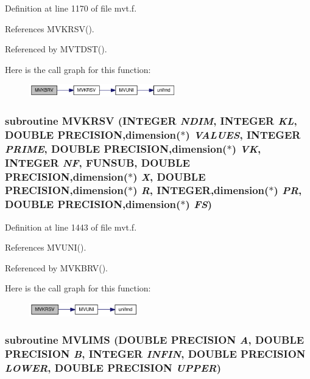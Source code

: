Definition at line 1170 of file mvt.f.

References MVKRSV().

Referenced by MVTDST().

Here is the call graph for this function:\nopagebreak
\begin{figure}[H]
\begin{center}
\leavevmode
\includegraphics[width=181pt]{mvt_8f_53a2e447659c04eb0ad551cf58c77d37_cgraph}
\end{center}
\end{figure}
\hypertarget{mvt_8f_6b32b1cb4d3243c9ffef2622d8cfa65d}{
\subsubsection[{MVKRSV}]{\setlength{\rightskip}{0pt plus 5cm}subroutine MVKRSV (INTEGER {\em NDIM}, \/  INTEGER {\em KL}, \/  DOUBLE PRECISION,dimension($\ast$) {\em VALUES}, \/  INTEGER {\em PRIME}, \/  DOUBLE PRECISION,dimension($\ast$) {\em VK}, \/  INTEGER {\em NF}, \/  FUNSUB, \/  DOUBLE PRECISION,dimension($\ast$) {\em X}, \/  DOUBLE PRECISION,dimension($\ast$) {\em R}, \/  INTEGER,dimension($\ast$) {\em PR}, \/  DOUBLE PRECISION,dimension($\ast$) {\em FS})}}
\label{mvt_8f_6b32b1cb4d3243c9ffef2622d8cfa65d}




Definition at line 1443 of file mvt.f.

References MVUNI().

Referenced by MVKBRV().

Here is the call graph for this function:\nopagebreak
\begin{figure}[H]
\begin{center}
\leavevmode
\includegraphics[width=134pt]{mvt_8f_6b32b1cb4d3243c9ffef2622d8cfa65d_cgraph}
\end{center}
\end{figure}
\hypertarget{mvt_8f_ae28c99f4b4ff2300cfa96ffa62bf799}{
\subsubsection[{MVLIMS}]{\setlength{\rightskip}{0pt plus 5cm}subroutine MVLIMS (DOUBLE PRECISION {\em A}, \/  DOUBLE PRECISION {\em B}, \/  INTEGER {\em INFIN}, \/  DOUBLE PRECISION {\em LOWER}, \/  DOUBLE PRECISION {\em UPPER})}}
\label{mvt_8f_ae28c99f4b4ff2300cfa96ffa62bf799}




